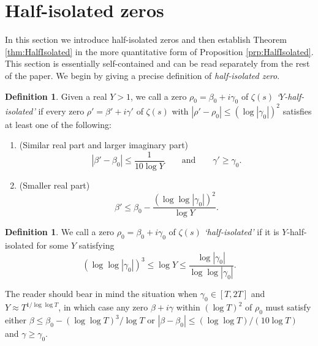 \documentclass[12pt]{amsart}
\theoremstyle{plain}
\theoremstyle{definition}
\newtheorem{definition}[theorem]{Definition}
\theoremstyle{remark}
\begin{document}
\section{Half-isolated zeros}\label{sec:HalfIsolated}
%
%
%
%
In this section we introduce half-isolated zeros and then establish Theorem \ref{thm:HalfIsolated} in the more quantitative form of Proposition \ref{prp:HalfIsolated}. This section is essentially self-contained and can be read separately from the rest of the paper. We begin by giving a precise definition of \emph{half-isolated zero}.
%
%
%
%
\begin{definition}\label{def:YHalfIsolated}
Given a real $Y>1$, we call a zero $\rho_0=\beta_0+i\gamma_0$ of $\zeta(s)$ \textit{`$Y$-half-isolated'} if every zero $\rho'=\beta'+i\gamma'$ of $\zeta(s)$ with $|\rho'-\rho_0|\le (\log{|\gamma_0|})^2$ satisfies at least one of the following:
\begin{enumerate}
\item (Similar real part and larger imaginary part)
\[
|\beta'-\beta_0|\le \frac{1}{10\log{Y}}\qquad \text{and} \qquad \gamma'\ge \gamma_0.
\]
\item (Smaller real part)
\[
\beta'\le \beta_0-\frac{(\log\log{|\gamma_0|})^2}{\log{Y}}.
\]
\end{enumerate}
\end{definition}
%
%
%
%
\begin{definition}\label{def:HalfIsolated}
We call a zero $\rho_0=\beta_0+i\gamma_0$ of $\zeta(s)$ \textit{`half-isolated'} if it is $Y$-half-isolated for some $Y$ satisfying
\[
(\log\log{|\gamma_0|})^3\le \log{Y}\le \frac{\log{|\gamma_0|}}{\log\log|\gamma_0|}.
\]
\end{definition}
%
%
%
%
The reader should bear in mind the situation when $\gamma_0\in[ T,2T]$ and $Y\approx T^{1/\log\log{T}}$, in which case any zero $\beta+i\gamma$ within $(\log{T})^2$ of $\rho_0$ must satisfy either $\beta\le \beta_0-(\log\log{T})^3/\log{T}$ or $|\beta-\beta_0|\leq (\log\log{T})/(10\log{T})$ and $\gamma\ge \gamma_0$.
%
%
%
%
\end{document}
